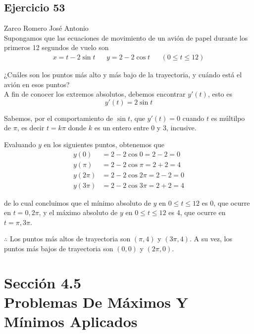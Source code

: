 \documentclass[12pt]{article}
\begin{document}
\subsection{Ejercicio 53} Zarco Romero José Antonio \\

Supongamos que las ecuaciones de movimiento de un avión de papel durante los primeros 12 segundos de vuelo son
\begin{align*}
  x=t-2\sin{t} && y=2-2\cos{t} && (0\leq t\leq 12)
\end{align*}

¿Cuáles son los puntos más alto y más bajo de la trayectoria, y cuándo está el avión en esos puntos? \\

A fin de conocer los extremos absolutos, debemos encontrar $y'(t)$, esto es
\[
y'(t)=2\sin{t}
\]

Sabemos, por el comportamiento de $\sin{t}$, que $y'(t)=0$ cuando $t$ es múltilpo de $\pi$, es decir $t=k\pi$ donde $k$ es un entero entre 0 y 3, incusive.

Evaluando $y$ en los siguientes puntos, obtenemos que
\begin{align*}
  y(0)
  &= 2-2\cos{0} = 2-2 = 0 \\
  y(\pi)
  &= 2-2\cos{\pi} = 2+2 = 4\\
  y(2\pi)
  &= 2-2\cos{2\pi} = 2-2 = 0\\
  y(3\pi)
  &= 2-2\cos{3\pi} =  2+2 = 4
\end{align*}

de lo cual concluimos que el mínimo absoluto de $y$ en $0\leq t\leq 12$ es 0, que ocurre en $t=0,2\pi$, y el máximo absoluto de $y$ en $0\leq t\leq 12$ es 4, que ocurre en $t = \pi,3\pi$.

$\therefore $ Los puntos más altos de trayectoria son $(\pi,4)$ y $(3\pi,4)$. A su vez, los puntos más bajos de trayectoria son $(0,0)$ y $(2\pi,0)$.

\section{Sección 4.5 \\ Problemas De Máximos Y Mínimos Aplicados}
\end{document}
